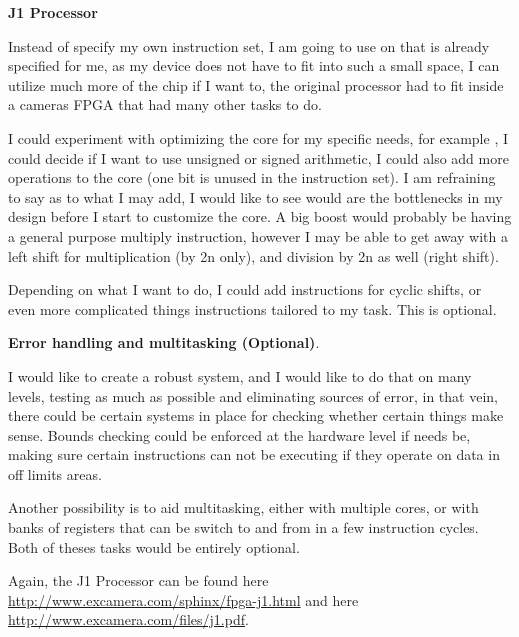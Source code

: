 \documentclass	[a4paper, 10pt]	{article}
\begin{document}
      \noindent \textbf{J1 Processor}

      Instead of specify my own instruction set, I am going to use on that is already
      specified for me, as my device does not have to fit into such a small space, I
      can utilize much more of the chip if I want to, the original processor had to fit
      inside a cameras FPGA that had many other tasks to do.

          I could experiment with optimizing the core for my specific needs, for example
      , I could decide if I want to use unsigned or signed arithmetic, I could also
      add more operations to the core (one bit is unused in the instruction set). I
      am refraining to say as to what I may add, I would like to see would are the
      bottlenecks in my design before I start to customize the core. A big boost would
      probably be having a general purpose multiply instruction, however I may be
      able to get away with a left shift for multiplication (by 2n only), and division
      by 2n as well (right shift).

          Depending on what I want to do, I could add instructions for cyclic shifts, or
      even more complicated things instructions tailored to my task. This is optional.

      \noindent \textbf{Error handling and multitasking (Optional)}.

      I would like to create a robust system, and I would like to do that on many
      levels, testing as much as possible and eliminating sources of error, in that
      vein, there could be certain systems in place for checking whether certain things
      make sense. Bounds checking could be enforced at the hardware level if needs
      be, making sure certain instructions can not be executing if they operate on
      data in off limits areas.

          Another possibility is to aid multitasking, either with multiple cores, or with
      banks of registers that can be switch to and from in a few instruction cycles.
      Both of theses tasks would be entirely optional.

        Again, the J1 Processor can be found here \url{http://www.excamera.com/sphinx/fpga-j1.html} 
        and here \url{http://www.excamera.com/files/j1.pdf}.
\end{document}
